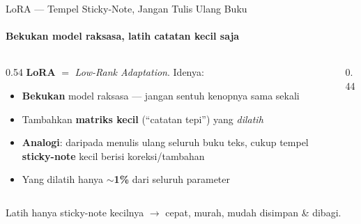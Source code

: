 \documentclass[aspectratio=169,t]{beamer}
\begin{document}
\begin{frame}{LoRA --- Tempel Sticky-Note, Jangan Tulis Ulang Buku}
  \framesubtitle{Bekukan model raksasa, latih catatan kecil saja}
  \begin{columns}[T]
    \begin{column}{0.54\textwidth}
      \footnotesize
      \textbf{LoRA} $=$ \emph{Low-Rank Adaptation}. Idenya:
      \begin{itemize}
        \item \textcolor{nvblue}{\textbf{Bekukan}} model raksasa --- jangan sentuh kenopnya sama sekali
        \item Tambahkan \textbf{matriks kecil} (``catatan tepi'') yang \emph{dilatih}
        \item \textbf{Analogi}: daripada menulis ulang seluruh buku teks, cukup tempel \textbf{sticky-note} kecil berisi koreksi/tambahan
        \item Yang dilatih hanya $\sim$\textbf{1\%} dari seluruh parameter
      \end{itemize}
    \end{column}
    \begin{column}{0.44\textwidth}
      \centering
    \end{column}
  \end{columns}
  \vspace{0.2em}
  \begin{center}
    \textcolor{nvlightgreen}{\small Latih hanya sticky-note kecilnya $\to$ cepat, murah, mudah disimpan \& dibagi.}
  \end{center}
\end{frame}
\end{document}
